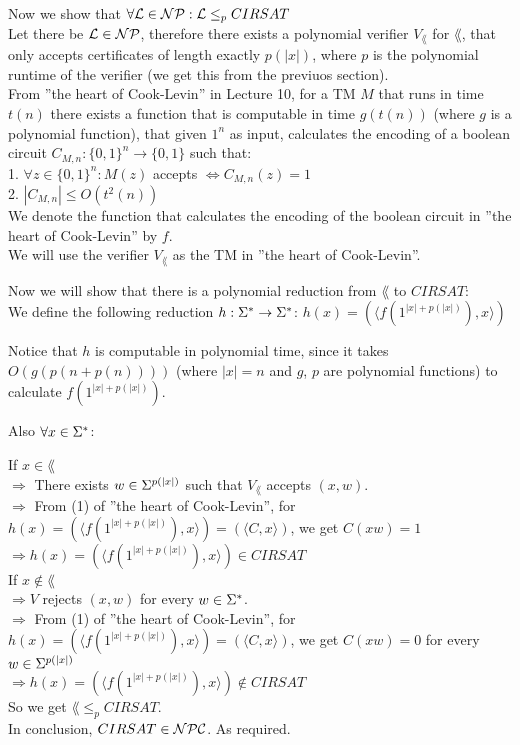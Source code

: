 \pagebreak

Now we show that $\forall \mathcal{L} \in \mathcal{N}\mathcal{P}: \mathcal{L} \leq_p CIRSAT$ \\
Let there be $\mathcal{L} \in \mathcal{N}\mathcal{P}$, therefore there exists a polynomial verifier $V_\lang$ for $\lang$, that only accepts
certificates of length exactly $p(|x|)$, where $p$ is the polynomial runtime of the verifier (we get this from the previuos section). \\

From ”the heart of Cook-Levin” in Lecture 10, for a TM $M$ that runs in time $t(n)$
there exists a function that is computable in time $g(t(n))$ (where $g$ is a polynomial function), that given $1^n$ as input, calculates
the encoding of a boolean circuit $C_{M,n}: \{0,1\}^n \rightarrow \{0,1\}$
such that: \\
1. $\forall z \in \{0,1\}^n: M(z)$ accepts $\iff C_{M,n}(z)=1$ \\
2. $|C_{M,n}| \leq O(t^2(n))$ \\

We denote the function that calculates the encoding of the boolean circuit in ”the heart of Cook-Levin” by $f$. \\
We will use the verifier $V_\lang$ as the TM in ”the heart of Cook-Levin”.

Now we will show that there is a polynomial reduction from $\lang$ to $CIRSAT$: \\
We define the following reduction $h: \Sigma^* \rightarrow \Sigma^*$:
$h(x) = (\langle f(1^{|x|+p(|x|)}), x \rangle)$

Notice that $h$ is computable in polynomial time, since it takes $O(g(p(n+p(n))))$ (where $|x|=n$ and $g$, $p$ are polynomial functions)
to calculate $f(1^{|x|+p(|x|)})$.

Also $\forall x \in \Sigma^*$:

If $x \in \lang$ \\
$\Rightarrow $ There exists $w \in \Sigma^{p(|x|)}$ such that $V_\lang$ accepts $(x, w)$. \\
$\Rightarrow $ From (1) of ”the heart of Cook-Levin”, for $h(x) = (\langle f(1^{|x|+p(|x|)}), x \rangle) = (\langle C, x \rangle)$,
we get $C(xw)=1$ \\
$\Rightarrow h(x) = (\langle f(1^{|x|+p(|x|)}), x \rangle) \in CIRSAT$ \\

If $x \notin \lang$ \\
$\Rightarrow V$ rejects $(x, w)$ for every $w \in \Sigma^*$. \\
$\Rightarrow $ From (1) of ”the heart of Cook-Levin”, for $h(x) = (\langle f(1^{|x|+p(|x|)}), x \rangle) = (\langle C, x \rangle)$,
we get $C(xw)=0$ for every $w \in \Sigma^{p(|x|)}$ \\
$\Rightarrow h(x) = (\langle f(1^{|x|+p(|x|)}), x \rangle) \notin CIRSAT$ \\

So we get \underline{$\lang \leq_p CIRSAT$}. \\
In conclusion, $CIRSAT \in \mathcal{N}\mathcal{P}\mathcal{C}$. As required.
